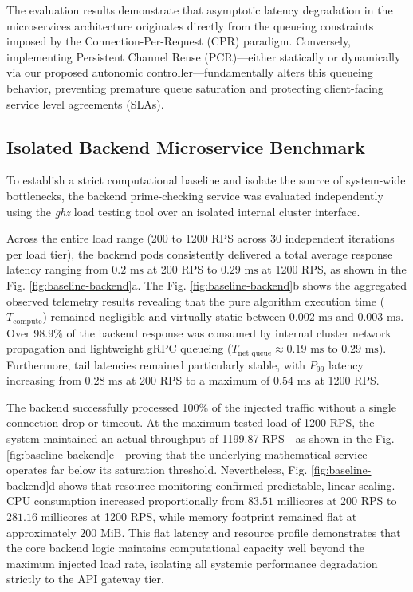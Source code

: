\documentclass{ieeeaccess}
\begin{document}
	The evaluation results demonstrate that asymptotic latency degradation in the microservices architecture originates directly from the queueing constraints imposed by the Connection-Per-Request (CPR) paradigm. Conversely, implementing Persistent Channel Reuse (PCR)—either statically or dynamically via our proposed autonomic controller—fundamentally alters this queueing behavior, preventing premature queue saturation and protecting client-facing service level agreements (SLAs).
	
	\subsection{Isolated Backend Microservice Benchmark}
	\label{sec5.1}
	
	To establish a strict computational baseline and isolate the source of system-wide bottlenecks, the backend prime-checking service was evaluated independently using the \textit{ghz} load testing tool over an isolated internal cluster interface.
	
	Across the entire load range (200 to 1200 RPS across 30 independent iterations per load tier), the backend pods consistently delivered a total average response latency ranging from $0.2\text{ ms}$ at 200 RPS to $0.29\text{ ms}$ at 1200 RPS, as shown in the Fig. \ref{fig:baseline-backend}a. The Fig. \ref{fig:baseline-backend}b shows the aggregated observed telemetry results revealing that the pure algorithm execution time ($T_{\text{compute}}$) remained negligible and virtually static between $0.002\text{ ms}$ and $0.003\text{ ms}$. Over 98.9\% of the backend response was consumed by internal cluster network propagation and lightweight gRPC queueing ($T_{\text{net\_queue}} \approx 0.19\text{ ms } \text{to } 0.29\text{ ms}$). Furthermore, tail latencies remained particularly stable, with $P_{99}$ latency increasing from $0.28\text{ ms}$ at 200 RPS to a maximum of $0.54\text{ ms}$ at 1200 RPS.
	
	The backend successfully processed 100\% of the injected traffic without a single connection drop or timeout. At the maximum tested load of 1200 RPS, the system maintained an actual throughput of 1199.87 RPS—as shown in the Fig. \ref{fig:baseline-backend}c—proving that the underlying mathematical service operates far below its saturation threshold. Nevertheless, Fig. \ref{fig:baseline-backend}d shows that resource monitoring confirmed predictable, linear scaling. CPU consumption increased proportionally from $83.51\text{ millicores}$ at 200 RPS to $281.16\text{ millicores}$ at 1200 RPS, while memory footprint remained flat at approximately $200\text{ MiB}$. This flat latency and resource profile demonstrates that the core backend logic maintains computational capacity well beyond the maximum injected load rate, isolating all systemic performance degradation strictly to the API gateway tier.
	
\end{document}
